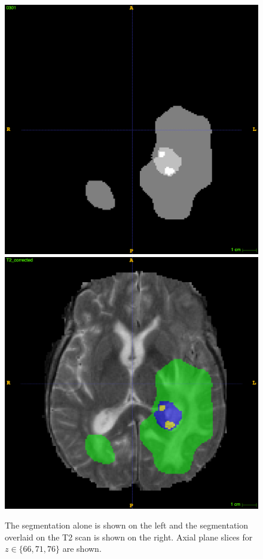 \documentclass[12pt,a4paper,twoside,openright]{report}
\begin{document}
\begin{figure}[h]
	\\
	\vspace{0.5cm}
	\includegraphics[scale = 0.1]{challenge_1_segmentation_76}
	\includegraphics[scale = 0.1]{challenge_1_segmentation_with_T2_76}
	
	\caption[Example segmentation computed using the model proposed by Pereira et al.]{The segmentation alone is shown on the left and the segmentation overlaid on the T2 scan is shown on the right. Axial plane slices for $z \in \{66, 71, 76\}$ are shown.}
	\label{fig:example_pereira_segmentation}
\end{figure}
\end{document}
